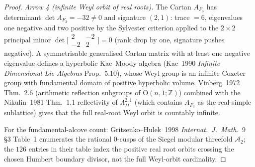 \begin{proof}
\emph{Arrow 4 (infinite Weyl orbit of real roots).}
The Cartan $A_{F_3}$ has determinant $\det A_{F_3} = -32\neq 0$ and
signature $(2, 1)$: trace $= 6$, eigenvalues one negative and two
positive by the Sylvester criterion applied to the $2\times 2$
principal minor $\det
\bigl[\begin{smallmatrix}2&-2\\-2&2\end{smallmatrix}\bigr] = 0$ (rank
drop by one, signature pushes negative). A symmetrisable generalised
Cartan matrix with at least one negative eigenvalue defines a
hyperbolic Kac--Moody algebra (Kac~1990 \emph{Infinite Dimensional
Lie Algebras} Prop.~5.10), whose Weyl group is an infinite
Coxeter group with fundamental domain of positive hyperbolic volume.
Vinberg~1972 Thm.~2.6 (arithmetic reflection subgroups of
$\mathrm O(n,1;\mathbb Z)$) combined with the Nikulin~1981 Thm.~1.1
reflectivity of $\Lambda^{2,1}_{II}$ (which contains $A_{F_3}$ as
the real-simple sublattice) gives that the full real-root Weyl
orbit is countably infinite.

For the fundamental-alcove count:
Gritsenko--Hulek~1998 \emph{Internat.~J.~Math.}~9 \S3 Table~1
enumerates the rational $0$-cusps of the Siegel modular threefold
$\mathcal A_2$; the $126$ entries in their table index the positive
real root orbits crossing the chosen
Humbert boundary divisor, not the full Weyl-orbit cardinality.


\end{proof}
